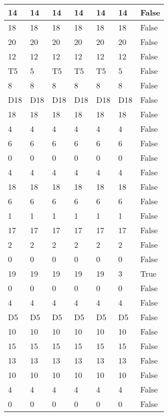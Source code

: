\begin{longtable}[htbp]{| p{} | p{} | p{}| p{}| p{}| p{}| p{}|}
14 & 14 & 14 & 14 & 14 & 14 & False \\ \hline
18 & 18 & 18 & 18 & 18 & 18 & False \\ \hline
20 & 20 & 20 & 20 & 20 & 20 & False \\ \hline
12 & 12 & 12 & 12 & 12 & 12 & False \\ \hline
\multicolumn{1}{|l|}{T5} & 5 & \multicolumn{1}{l|}{T5} & \multicolumn{1}{l|}{T5} & \multicolumn{1}{l|}{T5} & 5 & False \\ \hline
8 & 8 & 8 & 8 & 8 & 8 & False \\ \hline
\multicolumn{1}{|l|}{D18} & \multicolumn{1}{l|}{D18} & \multicolumn{1}{l|}{D18} & \multicolumn{1}{l|}{D18} & \multicolumn{1}{l|}{D18} & \multicolumn{1}{l|}{D18} & False \\ \hline
18 & 18 & 18 & 18 & 18 & 18 & False \\ \hline
4 & 4 & 4 & 4 & 4 & 4 & False \\ \hline
6 & 6 & 6 & 6 & 6 & 6 & False \\ \hline
0 & 0 & 0 & 0 & 0 & 0 & False \\ \hline
4 & 4 & 4 & 4 & 4 & 4 & False \\ \hline
18 & 18 & 18 & 18 & 18 & 18 & False \\ \hline
6 & 6 & 6 & 6 & 6 & 6 & False \\ \hline
1 & 1 & 1 & 1 & 1 & 1 & False \\ \hline
17 & 17 & 17 & 17 & 17 & 17 & False \\ \hline
2 & 2 & 2 & 2 & 2 & 2 & False \\ \hline
0 & 0 & 0 & 0 & 0 & 0 & False \\ \hline
19 & 19 & 19 & 19 & 19 & 3 & True \\ \hline
0 & 0 & 0 & 0 & 0 & 0 & False \\ \hline
4 & 4 & 4 & 4 & 4 & 4 & False \\ \hline
\multicolumn{1}{|l|}{D5} & \multicolumn{1}{l|}{D5} & \multicolumn{1}{l|}{D5} & \multicolumn{1}{l|}{D5} & \multicolumn{1}{l|}{D5} & \multicolumn{1}{l|}{D5} & False \\ \hline
10 & 10 & 10 & 10 & 10 & 10 & False \\ \hline
15 & 15 & 15 & 15 & 15 & 15 & False \\ \hline
13 & 13 & 13 & 13 & 13 & 13 & False \\ \hline
10 & 10 & 10 & 10 & 10 & 10 & False \\ \hline
4 & 4 & 4 & 4 & 4 & 4 & False \\ \hline
0 & 0 & 0 & 0 & 0 & 0 & False \\ \hline

\end{longtable}
